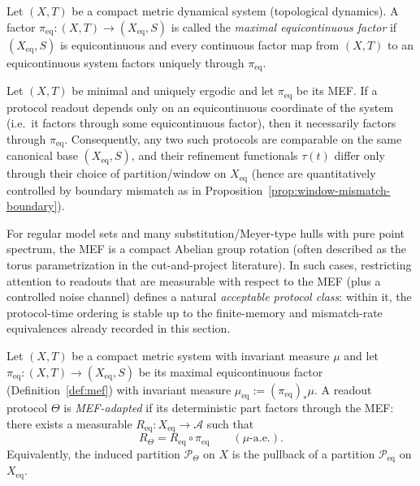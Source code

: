 \begin{definition}\label{def:mef}
Let $(X,T)$ be a compact metric dynamical system (topological dynamics). A factor $\pi_{\mathrm{eq}}:(X,T)\to (X_{\mathrm{eq}},S)$ is called the \emph{maximal equicontinuous factor} if $(X_{\mathrm{eq}},S)$ is equicontinuous and every continuous factor map from $(X,T)$ to an equicontinuous system factors uniquely through $\pi_{\mathrm{eq}}$.
\cite{Auslander1988,Ellis1969}
\end{definition}

\begin{proposition}\label{prop:mef-universal}
Let $(X,T)$ be minimal and uniquely ergodic and let $\pi_{\mathrm{eq}}$ be its MEF. If a protocol readout depends only on an equicontinuous coordinate of the system (i.e.\ it factors through some equicontinuous factor), then it necessarily factors through $\pi_{\mathrm{eq}}$.
Consequently, any two such protocols are comparable on the same canonical base $(X_{\mathrm{eq}},S)$, and their refinement functionals $\tau(t)$ differ only through their choice of partition/window on $X_{\mathrm{eq}}$ (hence are quantitatively controlled by boundary mismatch as in Proposition~\ref{prop:window-mismatch-boundary}).
\end{proposition}

\begin{remark}
For regular model sets and many substitution/Meyer-type hulls with pure point spectrum, the MEF is a compact Abelian group rotation (often described as the torus parametrization in the cut-and-project literature).\cite{BaakeGrimm2013,Moody2000}
In such cases, restricting attention to readouts that are measurable with respect to the MEF (plus a controlled noise channel) defines a natural \emph{acceptable protocol class}: within it, the protocol-time ordering is stable up to the finite-memory and mismatch-rate equivalences already recorded in this section.
\end{remark}

\begin{definition}\label{def:mef-adapted-protocol}
Let $(X,T)$ be a compact metric system with invariant measure $\mu$ and let $\pi_{\mathrm{eq}}:(X,T)\to (X_{\mathrm{eq}},S)$ be its maximal equicontinuous factor (Definition~\ref{def:mef}) with invariant measure $\mu_{\mathrm{eq}}:=(\pi_{\mathrm{eq}})_\ast\mu$.
A readout protocol $\Theta$ is \emph{MEF-adapted} if its deterministic part factors through the MEF:
there exists a measurable $R_{\mathrm{eq}}:X_{\mathrm{eq}}\to\mathcal{A}$ such that
\[
R_\Theta = R_{\mathrm{eq}}\circ \pi_{\mathrm{eq}}
\qquad (\mu\text{-a.e.}).
\]
Equivalently, the induced partition $\mathcal{P}_\Theta$ on $X$ is the pullback of a partition $\mathcal{P}_{\mathrm{eq}}$ on $X_{\mathrm{eq}}$.
\end{definition}

